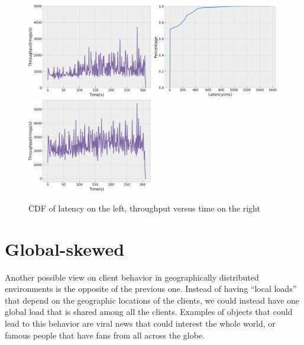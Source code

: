 \begin{figure}[H]
  \includegraphics[width=0.49\textwidth,height=\textheight,keepaspectratio]{img/local5_tp.png}
  \includegraphics[width=0.49\textwidth,height=\textheight,keepaspectratio]{img/local1_lat.png}
  \includegraphics[width=0.49\textwidth,height=\textheight,keepaspectratio]{img/local1_tp.png}
  \caption{ CDF of latency on the left, throughput versus time on the right }
  \label{fig:local50-performance}
\end{figure}

\section{Global-skewed}\label{sec:global-skewed}
Another possible view on client behavior in geographically distributed environments is the opposite of the previous one. Instead of having ``local loads'' that depend on the geographic locations of the clients, we could instead have one global load that is shared among all the clients. Examples of objects that could lead to this behavior are viral news that could interest the whole world, or famous people that have fans from all across the globe.

